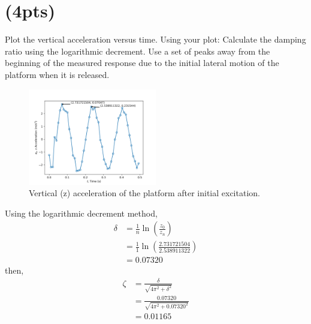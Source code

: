\section{(4pts)}
Plot the vertical acceleration versus time. Using your plot:
Calculate the damping ratio using the logarithmic decrement. Use a set of peaks 
away from the beginning of the measured response due to the initial lateral motion of the 
platform when it is released.

\begin{figure}[h]
    \centering
    \includegraphics[width=0.5\textwidth]{Questions/Plots/z_acceleration.png}
    \caption{Vertical (z) acceleration of the platform after initial excitation.}
    \label{fig:z_acceleration}
\end{figure}    

Using the logarithmic decrement method,
\begin{align*}
    \delta &= \frac{1}{n} \ln\left(\frac{z_0}{z_n}\right) \\
    &= \frac{1}{1} \ln\left(\frac{2.731721504}{2.538911322}\right) \\
    &= 0.07320
\end{align*}
then,
\begin{align*}
    \zeta &= \frac{\delta}{\sqrt{4\pi^2 + \delta^2}} \\
    &= \frac{0.07320}{\sqrt{4\pi^2 + 0.07320^2}} \\
    &= 0.01165
\end{align*}




